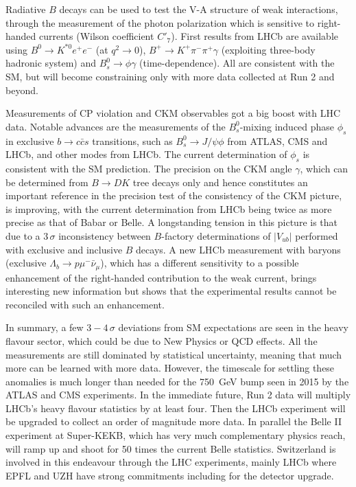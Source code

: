 \medskip
\noindent Radiative $B$ decays can be used to test the V-A structure of weak interactions, through the measurement of the photon
polarization which is sensitive to right-handed currents (Wilson coefficient $C'_7$). First results from LHCb are available
using $B^0 \to K^{*0}e^+e^-$ (at $q^2\to 0$), $B^+ \to K^+\pi^-\pi^+\gamma$ (exploiting three-body hadronic system) and 
$B^0_s \to \phi\gamma$ (time-dependence). All are consistent with the SM, but will become constraining only 
with more data collected at Run 2 and beyond.
\medskip

\noindent Measurements of CP violation and CKM observables got a big boost with LHC data. Notable advances are the measurements of the $B^0_s$-mixing induced phase $\phi_s$ in exclusive $b \to c \bar{c}s$ transitions, such as $B^0_s \to J/\psi \phi$ from ATLAS, CMS and LHCb, and other modes from LHCb. The current determination of $\phi_s$ is consistent with the SM prediction. The precision on the CKM angle $\gamma$, which can be determined from $B\to DK$ tree decays only and hence constitutes an important reference in the precision test of the consistency of the CKM picture, is improving, with the current determination from LHCb being twice as more precise as that of Babar or Belle.  A longstanding tension in this picture is that due to a $3\,\sigma$ inconsistency between $B$-factory determinations 
of $|V_{ub}|$ performed with exclusive and  inclusive $B$ decays. A new LHCb measurement with baryons (exclusive $\Lambda_b \to p \mu^-\bar{\nu}_\mu$), which has a different sensitivity to a possible enhancement of the right-handed contribution to the weak current, brings interesting new information but shows that the experimental results 
cannot be reconciled with such an enhancement.

\medskip

\noindent In summary, a few $3-4\,\sigma$ deviations from SM expectations are seen in the heavy flavour sector, which could
be due to New Physics or QCD effects. All the measurements are still dominated by statistical uncertainty, meaning that
much more can be learned with more data. However, the timescale for settling these anomalies is much longer than
needed for the 750~GeV bump seen in 2015 by the ATLAS and CMS experiments. In the immediate future, Run 2 data
will multiply LHCb's heavy flavour statistics by at least four. 
Then the LHCb experiment will be upgraded to collect an order of magnitude more data. 
In parallel the  Belle II experiment at Super-KEKB, which has very much complementary physics reach, 
will ramp up and shoot for 50 times the current Belle statistics.  Switzerland is involved in this endeavour through the LHC experiments, mainly LHCb where EPFL and UZH have strong commitments including for the detector upgrade.

